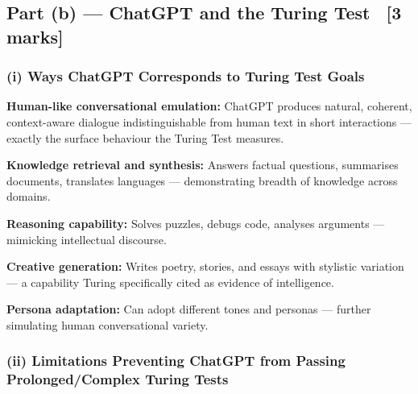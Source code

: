 \documentclass[12pt, a4paper]{article}
\begin{document}
\subsection{Part (b) — ChatGPT and the Turing Test \ [3 marks]}

\subsubsection*{(i) Ways ChatGPT Corresponds to Turing Test Goals}

\begin{keypoints}
  \item \textbf{Human-like conversational emulation:} ChatGPT produces natural, coherent, context-aware dialogue indistinguishable from human text in short interactions — exactly the surface behaviour the Turing Test measures.
  \item \textbf{Knowledge retrieval and synthesis:} Answers factual questions, summarises documents, translates languages — demonstrating breadth of knowledge across domains.
  \item \textbf{Reasoning capability:} Solves puzzles, debugs code, analyses arguments — mimicking intellectual discourse.
  \item \textbf{Creative generation:} Writes poetry, stories, and essays with stylistic variation — a capability Turing specifically cited as evidence of intelligence.
  \item \textbf{Persona adaptation:} Can adopt different tones and personas — further simulating human conversational variety.
\end{keypoints}

\subsubsection*{(ii) Limitations Preventing ChatGPT from Passing Prolonged/Complex Turing Tests}
\end{document}
